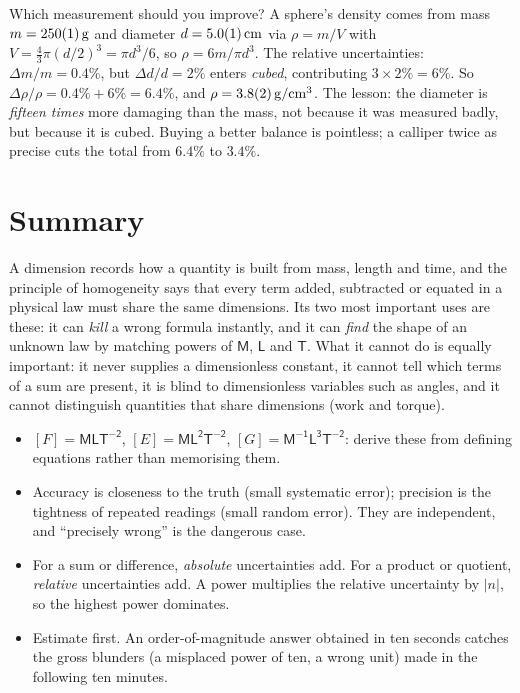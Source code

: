\begin{exbox}{Which measurement should you improve?}
A sphere's density comes from mass $m=\SI{250 \pm 1}{g}$ and diameter $d=\SI{5.0 \pm 0.1}{cm}$ via
$\rho=m/V$ with $V=\tfrac43\pi(d/2)^3=\pi d^3/6$, so $\rho=6m/\pi d^3$. The relative uncertainties: $\Delta m/m=0.4\%$, but $\Delta d/d=2\%$ enters
\emph{cubed}, contributing $3\times2\%=6\%$. So $\Delta\rho/\rho=0.4\%+6\%=6.4\%$, and
$\rho=\SI{3.8 \pm 0.2}{g/cm^3}$. The lesson: the diameter is \emph{fifteen times} more damaging than the
mass, not because it was measured badly, but because it is cubed. Buying a better balance is pointless;
a calliper twice as precise cuts the total from $6.4\%$ to $3.4\%$. 
\end{exbox}

\section{Summary}\label{sec:summary1}
A dimension records how a quantity is built from mass, length and time, and the principle of
homogeneity says that every term added, subtracted or equated in a physical law must share the same
dimensions. Its two most important uses are these: it can \emph{kill} a wrong formula instantly, and it can
\emph{find} the shape of an unknown law by matching powers of $\mathsf{M}$, $\mathsf{L}$ and $\mathsf{T}$.
What it cannot do is equally important: it never supplies a dimensionless constant, it cannot tell
which terms of a sum are present, it is blind to dimensionless variables such as angles, and it cannot
distinguish quantities that share dimensions (work and torque).

\begin{itemize}
\item $[F]=\mathsf{MLT^{-2}}$, $[E]=\mathsf{ML^2T^{-2}}$, $[G]=\mathsf{M^{-1}L^3T^{-2}}$: derive these from
      defining equations rather than memorising them.
\item Accuracy is closeness to the truth (small systematic error); precision is the tightness of repeated
      readings (small random error). They are independent, and ``precisely wrong'' is the dangerous case.
\item For a sum or difference, \emph{absolute} uncertainties add. For a product or quotient,
      \emph{relative} uncertainties add. A power multiplies the relative uncertainty by $|n|$, so the highest power dominates.
\item Estimate first. An order-of-magnitude answer obtained in ten seconds catches the gross blunders
      (a misplaced power of ten, a wrong unit) made in the following ten minutes.
\end{itemize}

